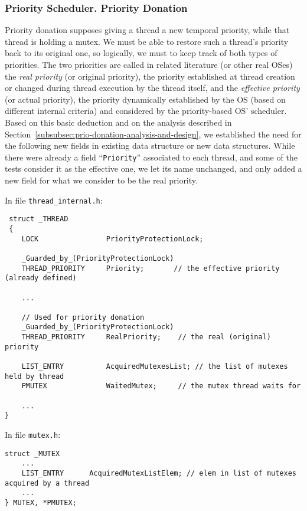 \subsubsection{Priority Scheduler. Priority Donation}
\label{subsubsec:prio-donation-data-structures}

Priority donation supposes giving a thread a new temporal priority, while that thread is holding a mutex. We must be able to restore such a thread's priority back to its original one, so logically, we must to keep track of both types of priorities. The two priorities are called in related literature (or other real OSes) the \textit{real priority} (or original priority), the priority established at thread creation or changed during thread execution by the thread itself, and the \textit{effective priority} (or actual priority), the priority dynamically established by the OS (based on different internal criteria) and considered by the priority-based OS' scheduler. Based on this basic deduction and on the analysis described in Section~\ref{subsubsec:prio-donation-analysis-and-design}, we established the need for the following new fields in existing data structure or new data structures. While there were already a field ``\lstinline|Priority|'' associated to each thread, and some of the tests consider it as the effective one, we let its name unchanged, and only added a new field for what we consider to be the real priority.

In file \lstinline|thread_internal.h|:

\begin{lstlisting}
 struct _THREAD
 {
    LOCK                PriorityProtectionLock;
 
    _Guarded_by_(PriorityProtectionLock)
    THREAD_PRIORITY     Priority;       // the effective priority (already defined)

    ...
    
    // Used for priority donation
    _Guarded_by_(PriorityProtectionLock)
    THREAD_PRIORITY     RealPriority;    // the real (original) priority
    
    LIST_ENTRY          AcquiredMutexesList; // the list of mutexes held by thread
    PMUTEX              WaitedMutex;     // the mutex thread waits for
    
    ...
}
\end{lstlisting}

In file \lstinline|mutex.h|:

\begin{lstlisting}
struct _MUTEX
    ...
    LIST_ENTRY      AcquiredMutexListElem; // elem in list of mutexes acquired by a thread
    ...
} MUTEX, *PMUTEX;
\end{lstlisting}

